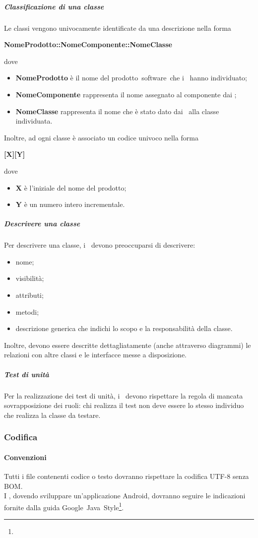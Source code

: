 \documentclass[../NormeProgetto.text]{subfiles}
\begin{document}
			\subparagraph{Classificazione di una classe}
				Le classi vengono univocamente identificate da una descrizione nella forma \begin{center}
				\textbf{NomeProdotto::NomeComponente::NomeClasse}
				\end{center} dove
				\begin{itemize}
					\item \textbf{NomeProdotto} è il nome del prodotto\g\ software\g\ che i \progettisti\ hanno individuato;
					\item \textbf{NomeComponente} rappresenta il nome assegnato al componente dai \progettisti;
					\item \textbf{NomeClasse} rappresenta il nome che è stato dato dai \progettisti\ alla classe individuata.
				\end{itemize}
				Inoltre, ad ogni classe è associato un codice univoco nella forma \begin{center}
				\textbf{[X][Y]}
				\end{center} dove
				\begin{itemize}
					\item \textbf{X} è l'iniziale del nome del prodotto\g;
					\item \textbf{Y} è un numero intero incrementale.
				\end{itemize}
			\subparagraph{Descrivere una classe}			
				Per descrivere una classe, i \progettisti\ devono preoccuparsi di descrivere:
				\begin{itemize}
					\item nome;
					\item visibilità;
					\item attributi;
					\item metodi;
					\item descrizione generica che indichi lo scopo e la responsabilità della classe.
				\end{itemize}
				Inoltre, devono essere descritte dettagliatamente (anche attraverso diagrammi) le relazioni con altre classi e le interfacce messe a disposizione.
			\subparagraph{Test di unità}
				Per la realizzazione dei test di unità, i \programmatori\ devono rispettare la regola di mancata sovrapposizione dei ruoli: chi realizza il test non deve essere lo stesso individuo che realizza la classe da testare.
		\subsubsection{Codifica}
			\paragraph{Convenzioni}
				Tutti i file contenenti codice o testo dovranno rispettare la codifica UTF-8 senza BOM\g.\\
				I \programmatori, dovendo sviluppare un'applicazione Android\g, dovranno seguire le indicazioni fornite dalla guida Google\g\ Java\g\ Style\footnote{}.
\end{document}
